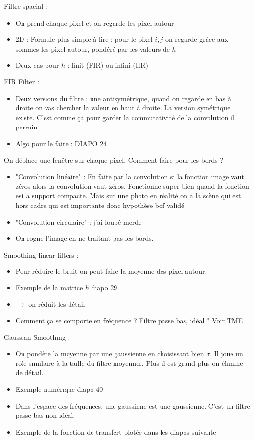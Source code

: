 \documentclass{article}
\theoremstyle{plain}%
\theoremstyle{definition}
\theoremstyle{remark}
\begin{document}
Filtre spacial : 
\begin{itemize}
    \item On prend chaque pixel et on regarde les pixel autour 
    \item 2D : Formule plus simple à lire : pour le pixel $ i,j $ on regarde grâce aux sommes les pixel autour, pondéré par les valeurs de $ h $ 
    \item Deux cas pour $ h $ : finit (FIR) ou infini (IIR)
\end{itemize}
FIR Filter : 
\begin{itemize}
    \item Deux versions du filtre : une antisymétrique, quand on regarde en bas à droite on vas chercher la valeur en haut à droite. La version symétrique existe. C'est comme ça pour garder la commutativité de la convolution il parrain. 
    \item Algo pour le faire : DIAPO 24
\end{itemize}

On déplace une fenêtre sur chaque pixel. Comment faire pour les bords ? 
\begin{itemize}
    \item "Convolution linéaire" : En faite par la convolution si la fonction image vaut zéros alors la convolution vaut zéros. Fonctionne super bien quand la fonction est a support compacte. Mais sur une photo en réalité on a la scène qui est hors cadre qui est importante donc hypothèse bof validé. 
    \item "Convolution circulaire" : j'ai loupé merde
    \item On rogne l'image en ne traitant pas les bords.
\end{itemize}

Smoothing linear filters : 
\begin{itemize}
    \item Pour réduire le bruit on peut faire la moyenne des pixel autour. 
    \item Exemple de la matrice $ h $ diapo 29
    \item $\rightarrow$ on réduit les détail
    \item Comment ça se comporte en fréquence ? Filtre passe bas, idéal ? Voir TME
\end{itemize}

Gaussian Smoothing :
\begin{itemize}
    \item On pondère la moyenne par une gaussienne en choisissant bien $ \sigma  $. Il joue un rôle similaire à la taille du filtre moyenner. Plus il est grand plus on élimine de détail.
    \item Exemple numérique diapo 40
    \item Dans l'espace des fréquences, une gaussinne est une gaussienne. C'est un filtre passe bas non idéal. 
    \item Exemple de la fonction de transfert plotée dans les diapos suivante
\end{itemize}
\end{document}
